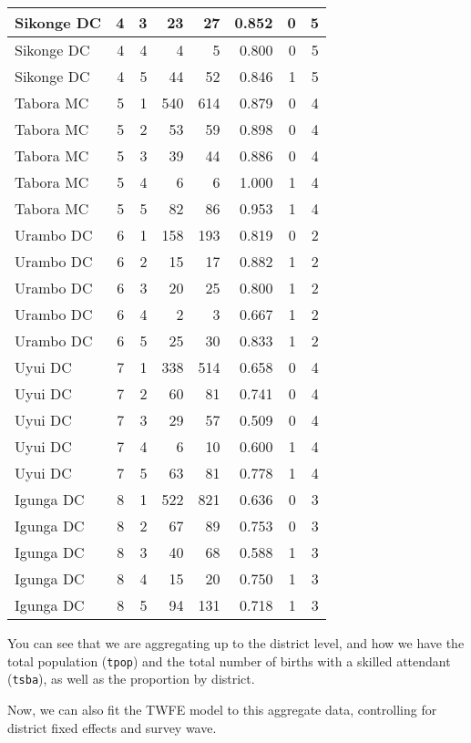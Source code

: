 \documentclass[
]{article}
\begin{document}
\begin{table}
\begin{tabular}[t]{l|r|r|r|r|r|r|r}
\hline
Sikonge DC & 4 & 3 & 23 & 27 & 0.852 & 0 & 5\\
\hline
Sikonge DC & 4 & 4 & 4 & 5 & 0.800 & 0 & 5\\
\hline
Sikonge DC & 4 & 5 & 44 & 52 & 0.846 & 1 & 5\\
\hline
Tabora MC & 5 & 1 & 540 & 614 & 0.879 & 0 & 4\\
\hline
Tabora MC & 5 & 2 & 53 & 59 & 0.898 & 0 & 4\\
\hline
Tabora MC & 5 & 3 & 39 & 44 & 0.886 & 0 & 4\\
\hline
Tabora MC & 5 & 4 & 6 & 6 & 1.000 & 1 & 4\\
\hline
Tabora MC & 5 & 5 & 82 & 86 & 0.953 & 1 & 4\\
\hline
Urambo DC & 6 & 1 & 158 & 193 & 0.819 & 0 & 2\\
\hline
Urambo DC & 6 & 2 & 15 & 17 & 0.882 & 1 & 2\\
\hline
Urambo DC & 6 & 3 & 20 & 25 & 0.800 & 1 & 2\\
\hline
Urambo DC & 6 & 4 & 2 & 3 & 0.667 & 1 & 2\\
\hline
Urambo DC & 6 & 5 & 25 & 30 & 0.833 & 1 & 2\\
\hline
Uyui DC & 7 & 1 & 338 & 514 & 0.658 & 0 & 4\\
\hline
Uyui DC & 7 & 2 & 60 & 81 & 0.741 & 0 & 4\\
\hline
Uyui DC & 7 & 3 & 29 & 57 & 0.509 & 0 & 4\\
\hline
Uyui DC & 7 & 4 & 6 & 10 & 0.600 & 1 & 4\\
\hline
Uyui DC & 7 & 5 & 63 & 81 & 0.778 & 1 & 4\\
\hline
Igunga DC & 8 & 1 & 522 & 821 & 0.636 & 0 & 3\\
\hline
Igunga DC & 8 & 2 & 67 & 89 & 0.753 & 0 & 3\\
\hline
Igunga DC & 8 & 3 & 40 & 68 & 0.588 & 1 & 3\\
\hline
Igunga DC & 8 & 4 & 15 & 20 & 0.750 & 1 & 3\\
\hline
Igunga DC & 8 & 5 & 94 & 131 & 0.718 & 1 & 3\\
\hline
\end{tabular}
\end{table}

You can see that we are aggregating up to the district level, and how we
have the total population (\texttt{tpop}) and the total number of births
with a skilled attendant (\texttt{tsba}), as well as the proportion by
district.

Now, we can also fit the TWFE model to this aggregate data, controlling
for district fixed effects and survey wave.
\end{document}
